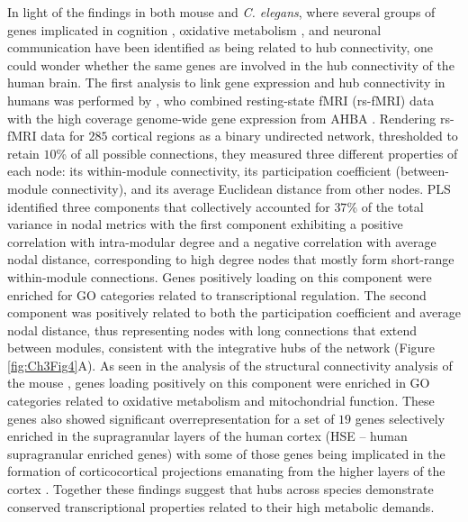 In light of the findings in both mouse and \textit{C. elegans}, where several groups of genes implicated in cognition \citep{Rubinov2015c}, oxidative metabolism \citep{Fulcher2016}, and neuronal communication \citep{Arnatkeviciute2018} have been identified as being related to hub connectivity, one could wonder whether the same genes are involved in the hub connectivity of the human brain. The first analysis to link gene expression and hub connectivity in humans was performed by \citet{Vertes2016b}, who combined resting-state fMRI (rs-fMRI) data with the high coverage genome-wide gene expression from AHBA \citep{Hawrylycz2012}.
Rendering rs-fMRI data for $285$ cortical regions as a binary undirected network, thresholded to retain $10$\% of all possible connections, they measured three different properties of each node: its within-module connectivity, its participation coefficient (between-module connectivity), and its average Euclidean distance from other nodes.
PLS identified three components that collectively accounted for $37$\% of the total variance in nodal metrics with the first component exhibiting a positive correlation with intra-modular degree and a negative correlation with average nodal distance, corresponding to high degree nodes that mostly form short-range within-module connections. Genes positively loading on this component were enriched for GO categories related to transcriptional regulation. The second component was positively related to both the participation coefficient and average nodal distance, thus representing nodes with long connections that extend between modules, consistent with the integrative hubs of the network (Figure \ref{fig:Ch3Fig4}A).
As seen in the analysis of the structural connectivity analysis of the mouse \citep{Fulcher2016}, genes loading positively on this component were enriched in GO categories related to oxidative metabolism and mitochondrial function.
These genes also showed significant overrepresentation for a set of $19$ genes \citep{Krienen2016} selectively enriched in the supragranular layers of the human cortex (HSE – human supragranular enriched genes) with some of those genes being implicated in the formation of corticocortical projections emanating from the higher layers of the cortex \citep{Krienen2016}.
Together these findings suggest that hubs across species demonstrate conserved transcriptional properties related to their high metabolic demands.

